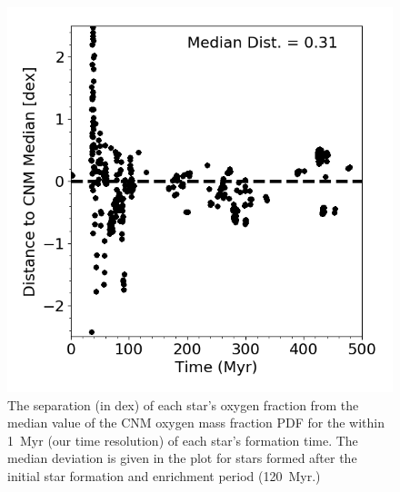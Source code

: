 \documentclass[twocolumn]{aastex61}
\begin{document}
%

\begin{figure}
\centering
\includegraphics[width=0.95\linewidth]{stellar_CNM_distance.png}
\caption{The separation (in dex) of each star's oxygen fraction from the median value of the CNM oxygen mass fraction PDF for the within 1~Myr (our time resolution) of each star's formation time. The median deviation is given in the plot for stars formed after the initial star formation and enrichment period (120~Myr.)}
\label{fig:stars}
\end{figure}
\end{document}
